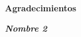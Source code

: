 
\begin{center}

\textbf{}

\vspace{2cm}

\Large{\textbf{Agradecimientos}}

\end{center}

\vspace{1cm}


\vspace{2cm}

\begin{flushright}

\textit{\textbf{Nombre 2}}

\end{flushright}


\pagestyle{empty}

